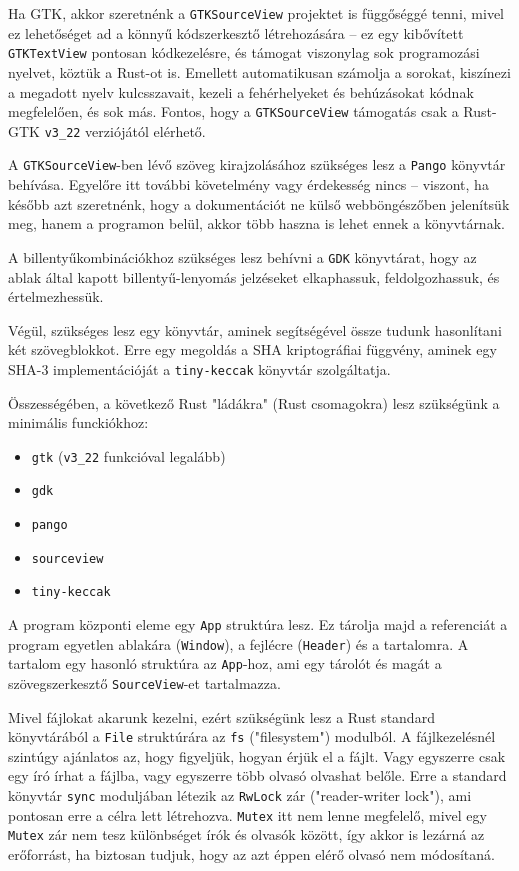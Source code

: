 Ha GTK, akkor szeretnénk a \texttt{GTKSourceView} projektet is függőséggé tenni, 
mivel ez lehetőséget ad a könnyű kódszerkesztő létrehozására -- ez egy kibővített \texttt{GTKTextView} pontosan kódkezelésre,
és támogat viszonylag sok programozási nyelvet, köztük a Rust-ot is.
Emellett automatikusan számolja a sorokat, kiszínezi a megadott nyelv kulcsszavait, 
kezeli a fehérhelyeket és behúzásokat kódnak megfelelően, és sok más.
Fontos, hogy a \texttt{GTKSourceView} támogatás csak a Rust-GTK \texttt{v3\_22} verziójától elérhető.

A \texttt{GTKSourceView}-ben lévő szöveg kirajzolásához szükséges lesz a \texttt{Pango} könyvtár behívása.
Egyelőre itt további követelmény vagy érdekesség nincs -- viszont, ha később azt szeretnénk, 
hogy a dokumentációt ne külső webböngészőben jelenítsük meg, hanem a programon belül, akkor több haszna is lehet ennek a könyvtárnak.

A billentyűkombinációkhoz szükséges lesz behívni a \texttt{GDK} könyvtárat, hogy az ablak által kapott
billentyű-lenyomás jelzéseket elkaphassuk, feldolgozhassuk, és értelmezhessük.

Végül, szükséges lesz egy könyvtár, aminek segítségével össze tudunk hasonlítani két szövegblokkot.
Erre egy megoldás a SHA kriptográfiai függvény, aminek egy SHA-3 implementációját a \texttt{tiny-keccak} könyvtár szolgáltatja.

Összességében, a következő Rust "ládákra" (Rust csomagokra) lesz szükségünk a minimális funckiókhoz:

\begin{itemize}
	\item \texttt{gtk} (\texttt{v3\_22} funkcióval legalább)
	\item \texttt{gdk}
	\item \texttt{pango}
	\item \texttt{sourceview}
	\item \texttt{tiny-keccak}
\end{itemize}


A program központi eleme egy \texttt{App} struktúra lesz. 
Ez tárolja majd a referenciát a program egyetlen ablakára (\texttt{Window}), a fejlécre (\texttt{Header})
és a tartalomra.
A tartalom egy hasonló struktúra az \texttt{App}-hoz, ami egy tárolót és magát a szövegszerkesztő \texttt{SourceView}-et tartalmazza.

Mivel fájlokat akarunk kezelni, ezért szükségünk lesz a Rust standard könyvtárából a \texttt{File} struktúrára
az \texttt{fs} ("filesystem") modulból.
A fájlkezelésnél szintúgy ajánlatos az, hogy figyeljük, hogyan érjük el a fájlt.
Vagy egyszerre csak egy író írhat a fájlba, vagy egyszerre több olvasó olvashat belőle.
Erre a standard könyvtár \texttt{sync} moduljában létezik az \texttt{RwLock} zár ("reader-writer lock"),
ami pontosan erre a célra lett létrehozva.
\texttt{Mutex} itt nem lenne megfelelő, mivel egy \texttt{Mutex} zár nem tesz különbséget írók és olvasók között,
így akkor is lezárná az erőforrást, ha biztosan tudjuk, hogy az azt éppen elérő olvasó nem módosítaná.

